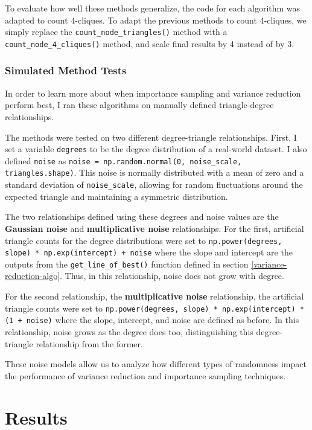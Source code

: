 \documentclass[11pt]{article}
\begin{document}
To evaluate how well these methods generalize, the code for each algorithm was adapted to count 4-cliques.
To adapt the previous methods to count 4-cliques, we simply replace the \lstinline{count_node_triangles()} method with a \lstinline{count_node_4_cliques()} method, and scale final results by 4 instead of by 3.

\subsubsection{Simulated Method Tests}

In order to learn more about when importance sampling and variance reduction perform best, I ran these algorithms on manually defined triangle-degree relationships.

The methods were tested on two different degree-triangle relationships.
First, I set a variable \lstinline{degrees} to be the degree distribution of a real-world dataset.
I also defined \lstinline{noise} as \lstinline{noise = np.random.normal(0, noise_scale, triangles.shape)}.
This noise is normally distributed with a mean of zero and a standard deviation of \lstinline{noise_scale}, allowing for random fluctuations around the expected triangle and maintaining a symmetric distribution.

The two relationships defined using these degrees and noise values are the \textbf{Gaussian noise} and \textbf{multiplicative noise} relationships.
For the first, artificial triangle counts for the degree distributions were set to \lstinline{np.power(degrees, slope) * np.exp(intercept) + noise} where the slope and intercept are the outputs from the \lstinline{get_line_of_best()} function defined in section \ref{variance-reduction-algo}.
Thus, in this relationship, noise does not grow with degree.

For the second relationship, the \textbf{multiplicative noise} relationship, the artificial triangle counts were set to \lstinline{np.power(degrees, slope) * np.exp(intercept) * (1 + noise)} where the slope, intercept, and noise are defined as before.
In this relationship, noise grows as the degree does too, distinguishing this degree-triangle relationship from the former.

These noise models allow us to analyze how different types of randomness impact the performance of variance reduction and importance sampling techniques.

\newpage

\section{Results}
\end{document}
